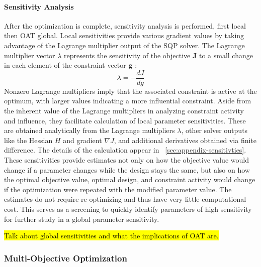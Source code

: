 \paragraph{Sensitivity Analysis}
After the optimization is complete, sensitivity analysis is performed, first local then OAT global. Local sensitivities provide various gradient values by taking advantage of the Lagrange multiplier output of the SQP solver. The Lagrange multiplier vector $\lambda$ represents the sensitivity of the objective $\textbf{J}$ to a small change in each element of the constraint vector $\textbf{g}$ \cite{martins_engineering_2022}:
\begin{equation}
    \lambda = -\frac{dJ}{dg} %
\end{equation}
Nonzero Lagrange multipliers imply that the associated constraint is active at the optimum, with larger values indicating a more influential constraint. Aside from the inherent value of the Lagrange multipliers in analyzing constraint activity and influence, they facilitate calculation of local parameter sensitivities. These are obtained analytically from the Lagrange multipliers $\lambda$, other solver outputs like the Hessian $H$ and gradient $\nabla  J$, and additional derivatives obtained via finite difference. The details of the calculation appear in \appendixname~\ref{sec:appendix-sensitivties}. These sensitivities provide estimates not only on how the objective value would change if a parameter changes while the design stays the same, but also on how the optimal objective value, optimal design, and constraint activity would change if the optimization were repeated with the modified parameter value. The estimates do not require re-optimizing and thus have very little computational cost. This serves as a screening to quickly identify parameters of high sensitivity for further study in a global parameter sensitivity. 


\hl{Talk about global sensitivities and what the implications of OAT are.} 

\subsubsection{Multi-Objective Optimization}\label{sec:multi-obj-process}
